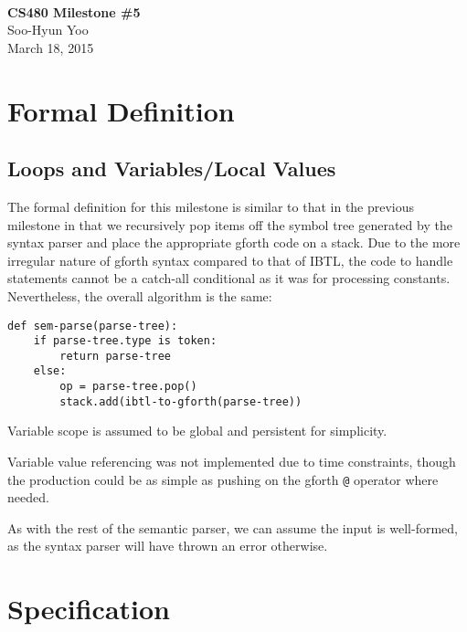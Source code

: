 \documentclass[12pt,letterpaper]{article}
\begin{document}
\fancyfoot{}
\begin{center}
    \hfill \\
    \vspace{4in}
    {\bf\Huge CS480 Milestone \#5 \\}
    \vspace{2in}
    {\Large Soo-Hyun Yoo \\ March 18, 2015}
\end{center}

\newpage
{}

\section*{Formal Definition}

\subsection*{Loops and Variables/Local Values}

The formal definition for this milestone is similar to that in the previous
milestone in that we recursively pop items off the symbol tree generated by the
syntax parser and place the appropriate gforth code on a stack. Due to the more
irregular nature of gforth syntax compared to that of IBTL, the code to handle
statements cannot be a catch-all conditional as it was for processing
constants. Nevertheless, the overall algorithm is the same:

\begin{verbatim}
def sem-parse(parse-tree):
    if parse-tree.type is token:
        return parse-tree
    else:
        op = parse-tree.pop()
        stack.add(ibtl-to-gforth(parse-tree))
\end{verbatim}

Variable scope is assumed to be global and persistent for simplicity.

Variable value referencing was not implemented due to time constraints, though
the production could be as simple as pushing on the gforth {\tt @} operator
where needed.

As with the rest of the semantic parser, we can assume the input is
well-formed, as the syntax parser will have thrown an error otherwise.

\section*{Specification}
\end{document}
